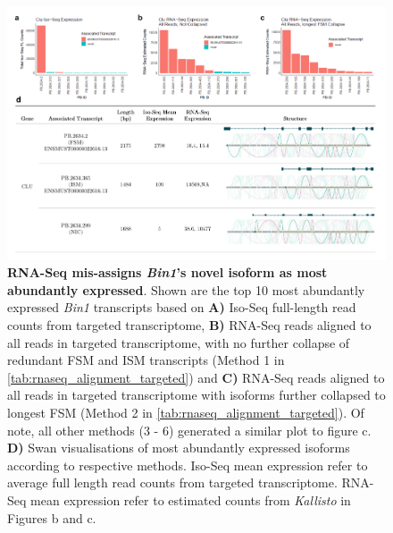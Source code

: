 \begin{landscape}
	
	\begin{figure}[htp]
		\centering
		\includegraphics[page=2,trim={0cm 0cm 0cm 0cm},clip,scale = 0.8]{Figures/ProjectDevelopment_Figures_Landscape.pdf}
		\captionsetup{width=1.2\textwidth,singlelinecheck=off}
		\caption[RNA-Seq mis-assignment of dominant isoform associated with \textit{Bin1}]%
		{\textbf{RNA-Seq mis-assigns \textit{Bin1}'s novel isoform as most abundantly expressed}. Shown are the top 10 most abundantly expressed \textit{Bin1} transcripts based on \textbf{A)} Iso-Seq full-length read counts from targeted transcriptome, \textbf{B)} RNA-Seq reads aligned to all reads in targeted transcriptome, with no further collapse of redundant FSM and ISM transcripts (Method 1 in \cref{tab:rnaseq_alignment_targeted}) and \textbf{C)} RNA-Seq reads aligned to all reads in targeted transcriptome with isoforms further collapsed to longest FSM (Method 2 in \cref{tab:rnaseq_alignment_targeted}). Of note, all other methods (3 - 6) generated a similar plot to figure c. \textbf{D)} Swan visualisations of most abundantly expressed isoforms according to respective methods. Iso-Seq mean expression refer to average full length read counts from targeted transcriptome. RNA-Seq mean expression refer to estimated counts from \textit{Kallisto} in Figures b and c. 
		}
		\label{fig:Bin1_TargetedRNAseqAlignment}
	\end{figure}
\end{landscape}
\restoregeometry



